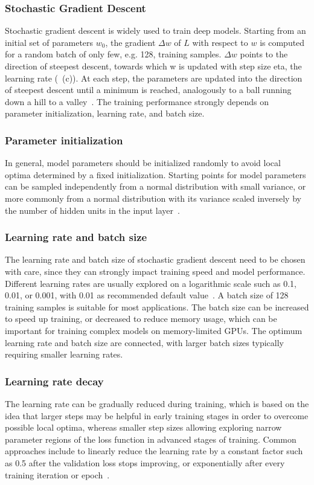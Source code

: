 \subsubsection{Stochastic Gradient Descent}
Stochastic gradient descent is widely used to train deep models. Starting from an initial set of parameters $w_0$, the gradient $\Delta w$ of $L$ with respect to $w$ is computed for a random batch of only few, e.g. 128, training samples. $\Delta w$ points to the direction of steepest descent, towards which w is updated with step size eta, the learning rate (~(c)). At each step, the parameters are updated into the direction of steepest descent until a minimum is reached, analogously to a ball running down a hill to a valley~\citep{bengio_practical_2012}. The training performance strongly depends on parameter initialization, learning rate, and batch size.

\subsubsection{Parameter initialization}
In general, model parameters should be initialized randomly to avoid local optima determined by a fixed initialization. Starting points for model parameters can be sampled independently from a normal distribution with small variance, or more commonly from a normal distribution with its variance scaled inversely by the number of hidden units in the input layer~\citep{glorot_understanding_2010,he_delving_2015}.

\subsubsection{Learning rate and batch size}
The learning rate and batch size of stochastic gradient descent need to be chosen with care, since they can strongly impact training speed and model performance. Different learning rates are usually explored on a logarithmic scale such as 0.1, 0.01, or 0.001, with 0.01 as recommended default value~\citep{bengio_practical_2012}. A batch size of 128 training samples is suitable for most applications. The batch size can be increased to speed up training, or decreased to reduce memory usage, which can be important for training complex models on memory-limited GPUs. The optimum learning rate and batch size are connected, with larger batch sizes typically requiring smaller learning rates.

\subsubsection{Learning rate decay}
The learning rate can be gradually reduced during training, which is based on the idea that larger steps may be helpful in early training stages in order to overcome possible local optima, whereas smaller step sizes allowing exploring narrow parameter regions of the loss function in advanced stages of training. Common approaches include to linearly reduce the learning rate by a constant factor such as 0.5 after the validation loss stops improving, or exponentially after every training iteration or epoch~\citep{bengio_practical_2012,gawehn_deep_2016}.

